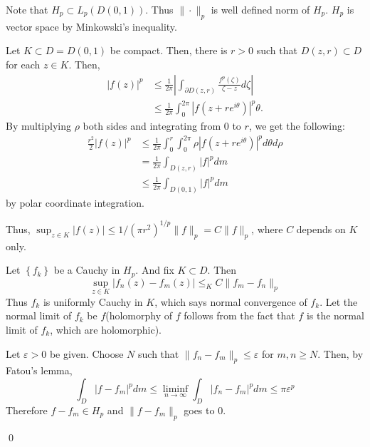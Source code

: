 \begin{problem}[1] \hfill

	Note that $H_p \subset L_p(D(0, 1))$. Thus $\| \cdot \|_p$ is well defined norm of $H_p$.
	$H_p$ is vector space by Minkowski's inequality.

	Let $K \subset D = D(0, 1)$ be compact.
	Then, there is $r>0$ such that $D(z, r) \subset D$ for each $z \in K$.
	Then,
	\[
		\begin{split}
			|f(z)|^p
			& \leq \frac{1}{2\pi} \left | \int_{\partial D(z, r)} \frac{f^p(\zeta)}{\zeta - z}d\zeta \right | \\
			& \leq \frac{1}{2\pi} \int_0^{2\pi} |f(z+re^{i\theta})|^p \theta.
		\end{split}
	\]
	By multiplying $\rho$ both sides and integrating from $0$ to $r$, we get the following:
	\[
		\begin{split}
			\frac{r^2}{2}|f(z)|^p
			& \leq \frac{1}{2\pi}\int_0^r \int_0^{2\pi} \rho |f(z+re^{i\theta})|^p d\theta d\rho \\
			& = \frac{1}{2\pi}\int_{D(z, r)} |f|^p dm \\
			& \leq \frac{1}{2\pi}\int_{D(0, 1)}|f|^p dm
		\end{split}
	\]
	by polar coordinate integration.

	Thus, $\sup_{z\in K} |f(z)| \leq 1/(\pi r^2)^{1/p} \| f \|_p = C\| f\|_p$, where $C$ depends on $K$ only.

	Let $\left\{ f_k \right\}$ be a Cauchy in $H_p$. And fix $K \subset D$. Then
	\[
		\sup_{z\in K} |f_n(z) - f_m(z)| \leq_K C \|f_m - f_n \|_p
	\]
	Thus $f_k$ is uniformly Cauchy in $K$, which says normal convergence of $f_k$.
	Let the normal limit of $f_k$ be $f$(holomorphy of $f$ follows from the fact that $f$ is the normal limit of $f_k$, which are holomorphic).

	Let $\varepsilon>0$ be given. Choose $N$ such that $\| f_n - f_m \| _p \leq \varepsilon$ for $m, n \geq N$.
	Then, by Fatou's lemma,
	\[
		\int_D |f -f_m|^p dm \leq \liminf_{n\rightarrow \infty} \int_D |f_n - f_m|^p dm \leq \pi \varepsilon^p
	\]
	Therefore $f-f_m \in H_p$ and $\| f - f_m \|_p$ goes to $0$.

	\qed
\end{problem}

